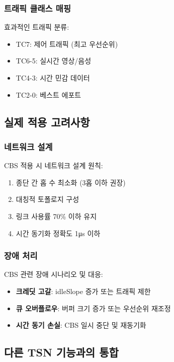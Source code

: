 \documentclass[twocolumn,10pt]{article}
\begin{document}
\subsubsection{트래픽 클래스 매핑}

효과적인 트래픽 분류:

\begin{itemize}
    \item TC7: 제어 트래픽 (최고 우선순위)
    \item TC6-5: 실시간 영상/음성
    \item TC4-3: 시간 민감 데이터
    \item TC2-0: 베스트 에포트
\end{itemize}

\subsection{실제 적용 고려사항}

\subsubsection{네트워크 설계}

CBS 적용 시 네트워크 설계 원칙:

\begin{enumerate}
    \item 종단 간 홉 수 최소화 (3홉 이하 권장)
    \item 대칭적 토폴로지 구성
    \item 링크 사용률 70\% 이하 유지
    \item 시간 동기화 정확도 1μs 이하
\end{enumerate}

\subsubsection{장애 처리}

CBS 관련 장애 시나리오 및 대응:

\begin{itemize}
    \item \textbf{크레딧 고갈}: idleSlope 증가 또는 트래픽 제한
    \item \textbf{큐 오버플로우}: 버퍼 크기 증가 또는 우선순위 재조정
    \item \textbf{시간 동기 손실}: CBS 일시 중단 및 재동기화
\end{itemize}

\subsection{다른 TSN 기능과의 통합}
\end{document}
